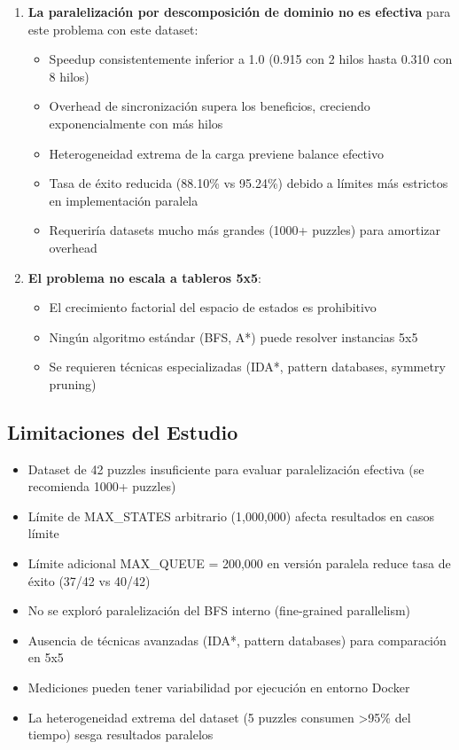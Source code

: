 \documentclass[12pt,a4paper]{article}
\begin{document}
\begin{enumerate}
    \item \textbf{La paralelización por descomposición de dominio no es efectiva} para este problema con este dataset:
    \begin{itemize}
        \item Speedup consistentemente inferior a 1.0 (0.915 con 2 hilos hasta 0.310 con 8 hilos)
        \item Overhead de sincronización supera los beneficios, creciendo exponencialmente con más hilos
        \item Heterogeneidad extrema de la carga previene balance efectivo
        \item Tasa de éxito reducida (88.10\% vs 95.24\%) debido a límites más estrictos en implementación paralela
        \item Requeriría datasets mucho más grandes (1000+ puzzles) para amortizar overhead
    \end{itemize}
    
    \item \textbf{El problema no escala a tableros 5x5}:
    \begin{itemize}
        \item El crecimiento factorial del espacio de estados es prohibitivo
        \item Ningún algoritmo estándar (BFS, A*) puede resolver instancias 5x5
        \item Se requieren técnicas especializadas (IDA*, pattern databases, symmetry pruning)
    \end{itemize}
\end{enumerate}

\subsection{Limitaciones del Estudio}

\begin{itemize}
    \item Dataset de 42 puzzles insuficiente para evaluar paralelización efectiva (se recomienda 1000+ puzzles)
    \item Límite de MAX\_STATES arbitrario (1,000,000) afecta resultados en casos límite
    \item Límite adicional MAX\_QUEUE = 200,000 en versión paralela reduce tasa de éxito (37/42 vs 40/42)
    \item No se exploró paralelización del BFS interno (fine-grained parallelism)
    \item Ausencia de técnicas avanzadas (IDA*, pattern databases) para comparación en 5x5
    \item Mediciones pueden tener variabilidad por ejecución en entorno Docker
    \item La heterogeneidad extrema del dataset (5 puzzles consumen >95\% del tiempo) sesga resultados paralelos
\end{itemize}
\end{document}
